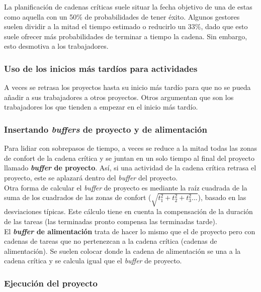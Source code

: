 \documentclass[12pt]{article}
\begin{document}
{La planificación de cadenas críticas suele situar la fecha objetivo de una de estas como aquella con un 50\% de probabilidades de tener éxito. Algunos gestores suelen dividir a la mitad el tiempo estimado o reducirlo un 33\%, dado que esto suele ofrecer más probabilidades de terminar a tiempo la cadena. Sin embargo, esto desmotiva a los trabajadores.}

\subsubsection{Uso de los inicios más tardíos para actividades}
\label{7.12.2}

{A veces se retrasa los proyectos hasta su inicio más tardío para que no se pueda añadir a sus trabajadores a otros proyectos. Otros argumentan que son los trabajadores los que tienden a empezar en el inicio más tardío.}

\subsubsection{Insertando \textit{buffers} de proyecto y de alimentación}
\label{7.12.3}

{Para lidiar con sobrepasos de tiempo, a veces se reduce a la mitad todas las zonas de confort de la cadena crítica y se juntan en un solo tiempo al final del proyecto llamado \textbf{\textit{buffer} de proyecto}. Así, si una actividad de la cadena crítica retrasa el proyecto, este se aplazará dentro del \textit{buffer} del proyecto.} \\

{Otra forma de calcular el \textit{buffer} de proyecto es mediante la raíz cuadrada de la suma de los cuadrados de las zonas de confort ($\sqrt{t_1^2 + t_2^2 + t_3^2...}$), basado en las desviaciones típicas. Este cálculo tiene en cuenta la compensación de la duración de las tareas (las terminadas pronto compensa las terminadas tarde).} \\

{El \textbf{\textit{buffer} de alimentación} trata de hacer lo mismo que el de proyecto pero con cadenas de tareas que no pertenezcan a la cadena crítica (cadenas de alimentación). Se suelen colocar donde la cadena de alimentación se una a la cadena crítica y se calcula igual que el \textit{buffer} de proyecto.}

\subsubsection{Ejecución del proyecto}
\label{7.12.4}
\end{document}
